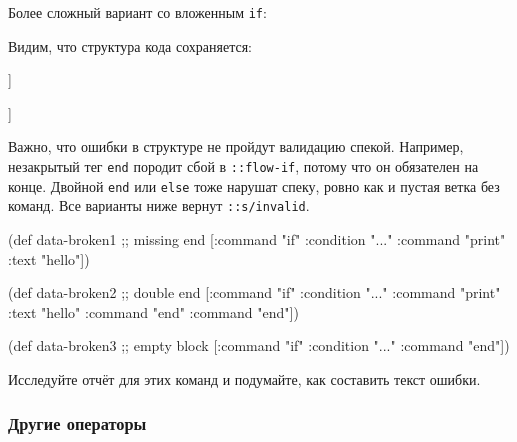 Более сложный вариант со вложенным \texttt{if}:


\begin{clojure}
\end{clojure}


Видим, что структура кода сохраняется:

\ifnarrow


\begin{clojure}
[[:if
  {:this {:command "if"
          :condition "..."}
   :flow
   [[:if
     {:this {:command "if"
             :condition "..."}
      :flow [[:cmd {:command "print"
                    :text "hello"}]]
      :end {:command "end"}}]]
   :end {:command "end"}}]]
\end{clojure}


\else


\begin{clojure}
[[:if
  {:this {:command "if" :condition "..."}
   :flow
   [[:if
     {:this {:command "if" :condition "..."}
      :flow [[:cmd {:command "print" :text "hello"}]]
      :end {:command "end"}}]]
   :end {:command "end"}}]]
\end{clojure}


\fi

Важно, что ошибки в структуре не пройдут валидацию спекой. Например, незакрытый
тег \texttt{end} породит сбой в \texttt{::flow-if}, потому что он обязателен на
конце. Двойной \texttt{end} или \texttt{else} тоже нарушат спеку, ровно как и
пустая ветка без команд. Все варианты ниже вернут \texttt{::s/invalid}.


\begin{clojure}
(def data-broken1 ;; missing end
  [{:command "if" :condition "..."}
   {:command "print" :text "hello"}])

(def data-broken2 ;; double end
  [{:command "if" :condition "..."}
   {:command "print" :text "hello"}
   {:command "end"}
   {:command "end"}])

(def data-broken3 ;; empty block
  [{:command "if" :condition "..."}
   {:command "end"}])
\end{clojure}


\pagebreakafive

Исследуйте отчёт  для этих команд и подумайте, как составить
текст ошибки.

\subsubsection*{Другие операторы}


